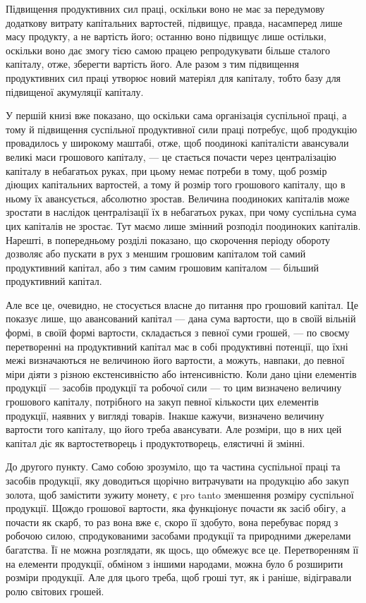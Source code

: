 Підвищення продуктивних сил праці, оскільки воно не має за передумову
додаткову витрату капітальних вартостей, підвищує, правда, насамперед
лише масу продукту, а не вартість його; останню воно підвищує
лише остільки, оскільки воно дає змогу тією самою працею репродукувати
більше сталого капіталу, отже, зберегти вартість його. Але разом з
тим підвищення продуктивних сил праці утворює новий матеріял для капіталу,
тобто базу для підвищеної акумуляції капіталу.

У першій книзі вже показано, що оскільки сама організація суспільної
праці, а тому й підвищення суспільної продуктивної сили праці потребує,
щоб продукцію провадилось у широкому маштабі, отже, щоб поодинокі
капіталісти авансували великі маси грошового капіталу, — це
стається почасти через централізацію капіталу в небагатьох руках, при
цьому немає потреби в тому, щоб розмір діющих капітальних вартостей,
а тому й розмір того грошового капіталу, що в ньому їх авансується,
абсолютно зростав. Величина поодиноких капіталів може зростати в наслідок
централізації їх в небагатьох руках, при чому суспільна сума цих
капіталів не зростає. Тут маємо лише змінний розподіл поодиноких капіталів.
Нарешті, в попередньому розділі показано, що скорочення періоду
обороту дозволяє або пускати в рух з меншим грошовим капіталом той
самий продуктивний капітал, або з тим самим грошовим капіталом —
більший продуктивний капітал.

Але все це, очевидно, не стосується власне до питання про грошовий
капітал. Це показує лише, що авансований капітал — дана сума вартости,
що в своїй вільній формі, в своїй формі вартости, складається з
певної суми грошей, — по своєму перетворенні на продуктивний капітал
має в собі продуктивні потенції, що їхні межі визначаються не величиною
його вартости, а можуть, навпаки, до певної міри діяти з різною екстенсивністю
або інтенсивністю. Коли дано ціни елементів продукції — засобів
продукції та робочої сили — то цим визначено величину грошового
капіталу, потрібного на закуп певної кількости цих елементів продукції,
наявних у вигляді товарів. Інакше кажучи, визначено величину вартости
того капіталу, що його треба авансувати. Але розміри, що в них цей
капітал діє як вартостетворець і продуктотворець, елястичні й змінні.

До другого пункту. Само собою зрозуміло, що та частина суспільної
праці та засобів продукції, яку доводиться щорічно витрачувати
на продукцію або закуп золота, щоб замістити зужиту монету, є pro
tanto зменшення розміру суспільної продукції. Щождо грошової вартости,
яка функціонує почасти як засіб обігу, а почасти як скарб, то раз
вона вже є, скоро її здобуто, вона перебуває поряд з робочою силою,
спродукованими засобами продукції та природними джерелами багатства.
Її не можна розглядати, як щось, що обмежує все це. Перетворенням її
на елементи продукції, обміном з іншими народами, можна було б розширити
розміри продукції. Але для цього треба, щоб гроші тут, як і
раніше, відігравали ролю світових грошей.

